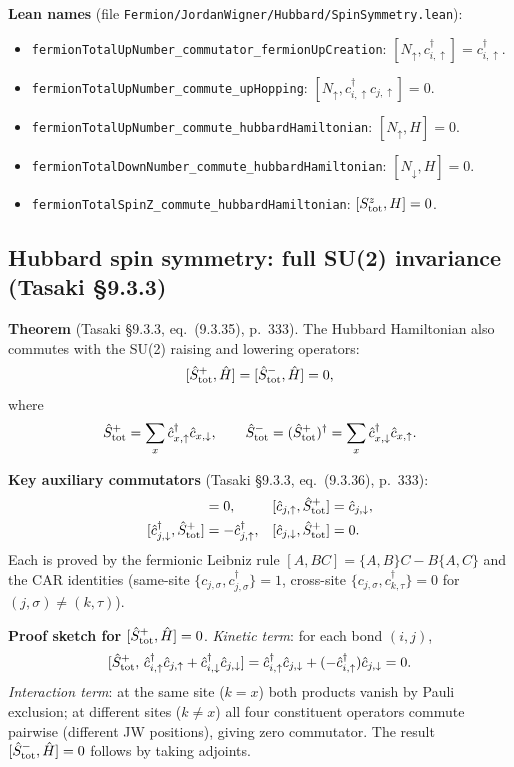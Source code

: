\documentclass[a4paper,11pt]{article}
\begin{document}
\noindent\textbf{Lean names} (file \texttt{Fermion/JordanWigner/Hubbard/SpinSymmetry.lean}):
\begin{itemize}
  \item \texttt{fermionTotalUpNumber\_commutator\_fermionUpCreation}:
    $[N_\uparrow, c^\dagger_{i,\uparrow}] = c^\dagger_{i,\uparrow}$.
  \item \texttt{fermionTotalUpNumber\_commute\_upHopping}:
    $[N_\uparrow, c^\dagger_{i,\uparrow}c_{j,\uparrow}] = 0$.
  \item \texttt{fermionTotalUpNumber\_commute\_hubbardHamiltonian}:
    $[N_\uparrow, H] = 0$.
  \item \texttt{fermionTotalDownNumber\_commute\_hubbardHamiltonian}:
    $[N_\downarrow, H] = 0$.
  \item \texttt{fermionTotalSpinZ\_commute\_hubbardHamiltonian}:
    $[S^z_{\rm tot}, H] = 0$.
\end{itemize}

\subsection{Hubbard spin symmetry: full SU(2) invariance (Tasaki §9.3.3)}
\label{subsec:hubbard-su2-symmetry}

\noindent\textbf{Theorem} (Tasaki §9.3.3, eq.~(9.3.35), p.~333).
The Hubbard Hamiltonian also commutes with the SU(2) raising and lowering operators:
\[
  [\hat S^+_{\rm tot}, \hat H] = [\hat S^-_{\rm tot}, \hat H] = 0,
\]
where
\[
  \hat S^+_{\rm tot} = \sum_{x} \hat c^\dagger_{x,\uparrow}\hat c_{x,\downarrow},
  \qquad
  \hat S^-_{\rm tot} = (\hat S^+_{\rm tot})^\dagger
    = \sum_x \hat c^\dagger_{x,\downarrow}\hat c_{x,\uparrow}.
\]

\noindent\textbf{Key auxiliary commutators} (Tasaki §9.3.3, eq.~(9.3.36), p.~333):
\begin{align*}
  [\hat c^\dagger_{j,\uparrow}, \hat S^+_{\rm tot}] &= 0, &
  [\hat c_{j,\uparrow},   \hat S^+_{\rm tot}] &= \hat c_{j,\downarrow}, \\
  [\hat c^\dagger_{j,\downarrow}, \hat S^+_{\rm tot}] &= -\hat c^\dagger_{j,\uparrow}, &
  [\hat c_{j,\downarrow},  \hat S^+_{\rm tot}] &= 0.
\end{align*}
Each is proved by the fermionic Leibniz rule
$[A, BC] = \{A,B\}C - B\{A,C\}$
and the CAR identities (same-site $\{c_{j,\sigma}, c^\dagger_{j,\sigma}\} = 1$,
cross-site $\{c_{j,\sigma}, c^\dagger_{k,\tau}\} = 0$ for $(j,\sigma)\neq(k,\tau)$).

\noindent\textbf{Proof sketch for $[\hat S^+_{\rm tot}, \hat H] = 0$}.
\emph{Kinetic term}: for each bond $(i,j)$,
\[
  [\hat S^+_{\rm tot},\, \hat c^\dagger_{i,\uparrow}\hat c_{j,\uparrow}
     + \hat c^\dagger_{i,\downarrow}\hat c_{j,\downarrow}]
  = \hat c^\dagger_{i,\uparrow}\hat c_{j,\downarrow}
    + (-\hat c^\dagger_{i,\uparrow})\hat c_{j,\downarrow} = 0.
\]
\emph{Interaction term}: at the same site ($k = x$) both products vanish by
Pauli exclusion; at different sites ($k \neq x$) all four constituent operators
commute pairwise (different JW positions), giving zero commutator.
The result $[\hat S^-_{\rm tot}, \hat H] = 0$ follows by taking adjoints.
\end{document}
